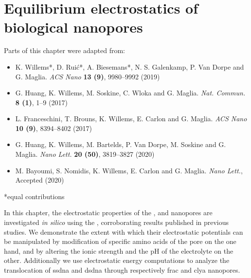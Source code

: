 \chapter{Equilibrium electrostatics of biological nanopores}
%
\label{ch:electrostatics}
%

%
%


%
%
\begin{shaded}
Parts of this chapter were adapted from:
%
\begin{itemize}
  \item K. Willems*, D. Rui\'{c}*, A. Biesemans*, N. S. Galenkamp, P. Van Dorpe and G. Maglia.
        \textit{ACS Nano} \textbf{13 (9)}, 9980--9992 (2019) %
  \item G. Huang, K. Willems, M. Soskine, C. Wloka and G. Maglia.
        \textit{Nat. Commun.} \textbf{8 (1)}, 1--9 (2017) %
  \item L. Franceschini,  T. Brouns, K. Willems, E. Carlon and G. Maglia.
        \textit{ACS Nano} \textbf{10 (9)}, 8394--8402 (2017) %
  \item G. Huang, K. Willems, M. Bartelds, P. Van Dorpe, M. Soskine and G. Maglia.
        \textit{Nano Lett.} \textbf{20 (50)}, 3819--3827 (2020) %
  \item M. Bayoumi, S. Nomidis, K. Willems, E. Carlon and G. Maglia.
        \textit{Nano Lett.}, Accepted (2020) %
\end{itemize}
%
*equal contributions
%
\newpage
\end{shaded}
%
%


In this chapter, the electrostatic properties of the ,  and 
nanopores are investigated \textit{in silico} using the , corroborating results published in
previous studies. We demonstrate the extent with which their electrostatic potentials can be manipulated by
modification of specific amino acids of the pore on the one hand, and by altering the ionic strength and the
pH of the electrolyte on the other. Additionally we use electrostatic energy computations to analyze the
translocation of \gls{ssdna} and \gls{dsdna} through respectively \gls{frac} and \gls{clya} nanopores. \\
%

